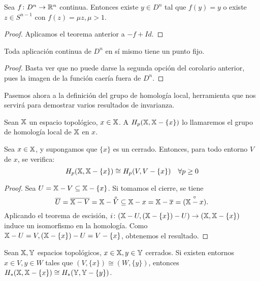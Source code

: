 \begin{corollary}
  Sea $f \colon D^n \to \mathbb{R}^n$ continua. Entonces existe $y \in D^n$ tal que $f(y) = y$ o existe $z \in S^{n-1}$ con $f(z) = \mu z, \mu > 1$.
\end{corollary}

\begin{proof}
  Aplicamos el teorema anterior a $-f + Id$.
\end{proof}

\begin{corollary}
  Toda aplicación continua de $D^n$ en sí mismo tiene un punto fijo.
\end{corollary}

\begin{proof}
  Basta ver que no puede darse la segunda opción del corolario anterior, pues la imagen de la función caería fuera de $D^n$.
\end{proof}

Pasemos ahora a la definición del grupo de homología local, herramienta que nos servirá para demostrar varios resultados de invarianza.

\begin{definition}
  Sean ${\mathbb X}$ un espacio topológico, $x \in {\mathbb X}$. A $H_p({\mathbb X}, {\mathbb X} - \{x\})$ lo llamaremos el grupo de homología local de ${\mathbb X}$ en $x$.
\end{definition}

\begin{proposition}
  Sea $x \in {\mathbb X}$, y supongamos que $\{x\}$ es un cerrado. Entonces, para todo entorno $V$ de $x$, se verifica:
  \[ H_p({\mathbb X}, {\mathbb X} - \{x\}) \cong H_p(V, V - \{x\}) \quad \forall p \geq 0 \]
\end{proposition}

\begin{proof}
  Sea $U = {\mathbb X} - V \subseteq {\mathbb X} - \{x\}$. Si tomamos el cierre, se tiene
  \[ \overline{U} = \overline{\X - V} = \X - \interior{V} \subseteq \X - x = \X - \overline{x} = \interior{(\X - x)} .\]
  Aplicando el teorema de escisión, $i \colon ({\mathbb X} - U, ({\mathbb X} - \{x\}) - U) \to ({\mathbb X}, {\mathbb X} - \{x\})$ induce un isomorfismo en la homología.
  Como ${\mathbb X} - U = V, ({\mathbb X} - \{x\}) - U = V - \{x\}$, obtenemos el resultado.
\end{proof}

\begin{proposition}
  Sean ${\mathbb X}, {\mathbb Y}$ espacios topológicos, $x \in {\mathbb X}, y \in {\mathbb Y}$ cerrados. Si existen entornos $x \in V, y \in W$ tales que $(V, \{x\}) \cong (W, \{y\})$,
  entonces $H_*({\mathbb X}, {\mathbb X} - \{x\}) \cong H_*({\mathbb Y}, {\mathbb Y} - \{y\})$.
\end{proposition}

